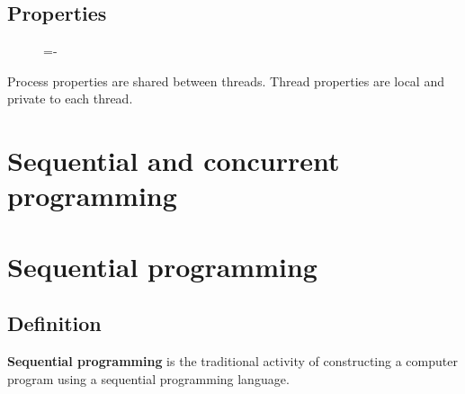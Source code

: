 \documentclass[a4paper]{systems-software}
\begin{document}
\subsection*{Properties}

\begin{figure}[H]
  \lineskip=-\fboxrule
\end{figure}

Process properties are shared between threads.
Thread properties are local and private to each thread.


\section{Sequential and concurrent programming}

\section*{Sequential programming}

\subsection*{Definition}

\textbf{Sequential programming} is the traditional activity of constructing a computer program using a sequential programming language.
\end{document}
